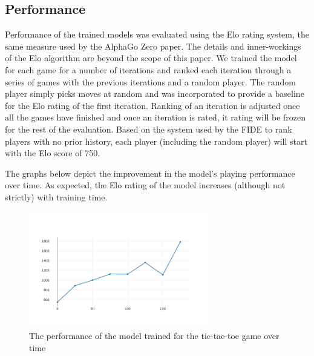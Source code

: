 \documentclass[english]{article}
\begin{document}
\subsection{Performance}

Performance of the trained models was evaluated using the Elo\cite{Elo} rating
system, the same measure used by the AlphaGo Zero paper. The details and
inner-workings of the Elo algorithm are beyond the scope of this paper. We
trained the model for each game for a number of iterations and ranked each
iteration through a series of games with the previous iterations and a random
player. The random player simply picks moves at random and was incorporated to
provide a baseline for the Elo rating of the first iteration. Ranking of an
iteration is adjusted once all the games have finished and once an iteration is
rated, it rating will be frozen for the rest of the evaluation. Based on the
system used by the FIDE \cite{Elo} to rank players with no prior history, each player (including the random player) will start with the Elo score of 750. 

The graphs below depict the improvement in the model's playing performance over time. As expected, the Elo rating of the model increases (although not strictly) with training time.

\begin{figure}[h]
\centering
\includegraphics[width=0.7\textwidth]{./images/ttt}
\caption{The performance of the model trained for the tic-tac-toe game over time}
\label{fig:figure_ttt}
\end{figure}
\end{document}
